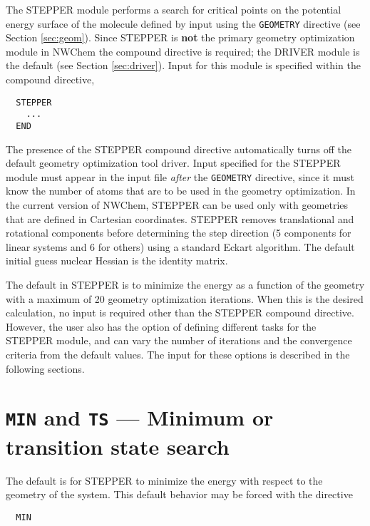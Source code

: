 %
%

\label{sec:stepper}

The STEPPER module performs a search for critical points on the
potential energy surface of the molecule defined by input using the
\verb+GEOMETRY+ directive (see Section \ref{sec:geom}).  Since STEPPER
is {\bf not} the primary geometry optimization module in NWChem the
compound directive is required; the DRIVER module is the default (see
Section {\ref{sec:driver}}).  Input for this module is
specified within the compound directive,

\begin{verbatim}
  STEPPER
    ...
  END
\end{verbatim}

The presence of the STEPPER compound directive automatically turns off
the default geometry optimization tool driver. Input specified for the
STEPPER module must appear in the input file {\em after} the
\verb+GEOMETRY+ directive, since it must know the number of atoms that
are to be used in the geometry optimization.  In the current version
of NWChem, STEPPER can be used only with geometries that are defined
in Cartesian coordinates.  STEPPER removes translational and
rotational components before determining the step direction (5
components for linear systems and 6 for others) using a standard
Eckart algorithm.  The default initial guess nuclear Hessian is the
identity matrix.

The default in STEPPER is to minimize the energy as a function of the
geometry with a maximum of 20 geometry optimization iterations.  When
this is the desired calculation, no input is required other than the
STEPPER compound directive.  However, the user also has the option of
defining different tasks for the STEPPER module, and can vary the
number of iterations and the convergence criteria from the default
values.  The input for these options is described in the following
sections.

\section{{\tt MIN} and {\tt TS} --- Minimum or transition state search}

The default is for STEPPER to minimize the energy with respect to the
geometry of the system.  This default behavior may be forced with the
directive
\begin{verbatim}
  MIN
\end{verbatim}

